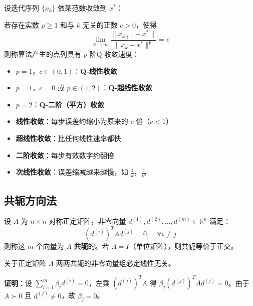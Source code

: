 设迭代序列 $\{x_k\}$ 依某范数收敛到 $x^*$：

\begin{definition}[Q-收敛速度]
若存在实数 $p \geq 1$ 和与 $k$ 无关的正数 $c > 0$，使得
\[
\lim_{k \to \infty} \frac{\|x_{k+1} - x^*\|}{\|x_k - x^*\|^p} = c
\]
则称算法产生的点列具有 $p$ 阶Q-收敛速度：
\begin{itemize}[itemsep=0.2em]
    \item $p = 1$，$c \in (0, 1)$：\textbf{Q-线性收敛}
    \item $p = 1$，$c = 0$ 或 $p \in (1, 2)$：\textbf{Q-超线性收敛}
    \item $p = 2$：\textbf{Q-二阶（平方）收敛}
\end{itemize}
\end{definition}

\begin{conceptbox}[直观感受]
\begin{itemize}[itemsep=0.3em]
    \item \textbf{线性收敛}：每步误差约缩小为原来的 $c$ 倍（$c < 1$）
    \item \textbf{超线性收敛}：比任何线性速率都快
    \item \textbf{二阶收敛}：每步有效数字约翻倍
    \item \textbf{次线性收敛}：误差缩减越来越慢，如 $\frac{1}{k}$，$\frac{1}{k^2}$
\end{itemize}
\end{conceptbox}

\subsection{共轭方向法}

\begin{definition}[共轭方向]
设 $A$ 为 $n \times n$ 对称正定矩阵，非零向量 $d^{(1)}, d^{(2)}, \ldots, d^{(m)} \in \mathbb{R}^n$ 满足：
\[
(d^{(i)})^T A d^{(j)} = 0,\quad \forall i \neq j
\]
则称这 $m$ 个向量为 $A$-\textbf{共轭}的。若 $A = I$（单位矩阵），则共轭等价于正交。
\end{definition}

\begin{property}[共轭向量的线性无关性]
关于正定矩阵 $A$ 两两共轭的非零向量组必定线性无关。
\end{property}

\textbf{证明}：设 $\sum_{i=1}^{m} \beta_i d^{(i)} = 0$，左乘 $(d^{(j)})^T A$ 得 $\beta_j (d^{(j)})^T A d^{(j)} = 0$。由于 $A \succ 0$ 且 $d^{(j)} \neq 0$，故 $\beta_j = 0$。

